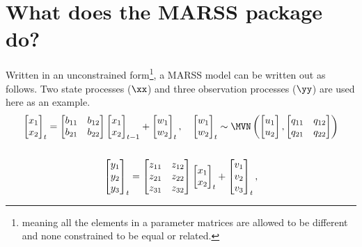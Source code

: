 \section{What does the MARSS package do?}
Written in an unconstrained form\footnote{meaning all the elements in a parameter matrices are allowed to be different and none constrained to be equal or related.}, a MARSS model can be written out as follows. Two state processes ($\xx$) and three observation processes ($\yy$) are used here as an example.
\begin{gather*}
\begin{bmatrix}x_1\\ x_2\end{bmatrix}_t
= \begin{bmatrix}b_{11}&b_{12}\\b_{21}&b_{22}\end{bmatrix}
\begin{bmatrix}x_1\\x_2\end{bmatrix}_{t-1}
+ \begin{bmatrix}w_1\\ w_2\end{bmatrix}_t,\quad 
\begin{bmatrix}w_1\\ w_2\end{bmatrix}_t \sim \MVN\begin{pmatrix}\begin{bmatrix}u_1\\u_2\end{bmatrix},\begin{bmatrix}q_{11}&q_{12}\\q_{21}&q_{22}\end{bmatrix} \end{pmatrix}  \\
\\
\begin{bmatrix}y_1\\ y_2\\ y_3\end{bmatrix}_t
= \begin{bmatrix}z_{11}&z_{12}\\ z_{21}&z_{22}\\ z_{31}&z_{32}\end{bmatrix}
\begin{bmatrix}x_1\\ x_2\end{bmatrix}_t
+ \begin{bmatrix}v_1\\ v_2\\ v_3\end{bmatrix}_t,

\end{gather*}
